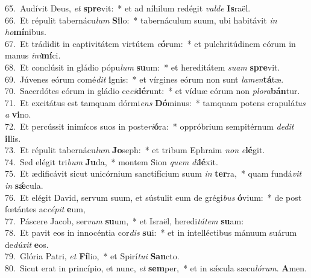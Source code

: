 {65.~}Audívit Deus, \textit{et} \textbf{spre}vit:~* et ad níhilum redégit \textit{val}\textit{de} \textbf{Is}raël.\\
{66.~}Et répulit tabernácu\textit{lum} \textbf{Si}lo:~* tabernáculum suum, ubi habitávit \textit{in} \textit{ho}\textbf{mí}nibus.\\
{67.~}Et trádidit in captivitátem virtútem \textit{e}\textbf{ó}rum:~* et pulchritúdinem eórum in manus \textit{i}\textit{ni}\textbf{mí}ci.\\
{68.~}Et conclúsit in gládio pópu\textit{lum} \textbf{su}um:~* et hereditátem \textit{su}\textit{am} \textbf{spre}vit.\\
{69.~}Júvenes eórum comé\textit{dit} \textbf{i}gnis:~* et vírgines eórum non sunt \textit{la}\textit{men}\textbf{tá}tæ.\\
{70.~}Sacerdótes eórum in gládio ce\textit{ci}\textbf{dé}runt:~* et víduæ eórum non \textit{plo}\textit{ra}\textbf{bán}tur.\\
{71.~}Et excitátus est tamquam dórmi\textit{ens} \textbf{Dó}minus:~* tamquam potens crapulá\textit{tus} \textit{a} \textbf{vi}no.\\
{72.~}Et percússit inimícos suos in poste\textit{ri}\textbf{ó}ra:~* oppróbrium sempitérnum \textit{de}\textit{dit} \textbf{il}lis.\\
{73.~}Et répulit tabernácu\textit{lum} \textbf{Jo}seph:~* et tribum Ephraim \textit{non} \textit{e}\textbf{lé}git.\\
{74.~}Sed elégit tri\textit{bum} \textbf{Ju}da,~* montem Sion \textit{quem} \textit{di}\textbf{lé}xit.\\
{75.~}Et ædificávit sicut unicórnium sanctifícium suum \textit{in} \textbf{ter}ra,~* quam fundá\textit{vit} \textit{in} \textbf{sǽ}cula.\\
{76.~}Et elégit David, servum suum, et sústulit eum de grégi\textit{bus} \textbf{ó}vium:~* de post fœtántes ac\textit{cé}\textit{pit} \textbf{e}um,\\
{77.~}Páscere Jacob, ser\textit{vum} \textbf{su}um,~* et Israël, heredi\textit{tá}\textit{tem} \textbf{su}am:\\
{78.~}Et pavit eos in innocéntia cor\textit{dis} \textbf{su}i:~* et in intelléctibus mánuum suárum de\textit{dú}\textit{xit} \textbf{e}os.\\
{79.~}Glória Patri, \textit{et} \textbf{Fí}lio,~* et Spirí\textit{tu}\textit{i} \textbf{San}cto.\\
{80.~}Sicut erat in princípio, et nunc, \textit{et} \textbf{sem}per,~* et in sǽcula sæcu\textit{ló}\textit{rum}. \textbf{A}men.\\
